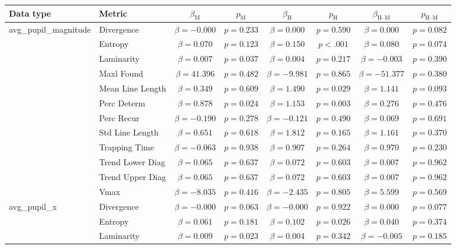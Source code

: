 \begin{tabular}{llcc|cc|cc}
\toprule
Data type & Metric & $\beta_{\text{M}}$ & $p_{\text{M}}$ & $\beta_{\text{H}}$ & $p_{\text{H}}$ & $\beta_{\text{H--M}}$ & $p_{\text{H--M}}$ \\
\midrule
\multirow{12}{*}{avg_pupil_magnitude} & Divergence & $\beta = -0.000$ & $p = 0.233$ & $\beta = 0.000$ & $p = 0.590$ & $\beta = 0.000$ & $p = 0.082$ \\
 & Entropy & $\beta = 0.070$ & $p = 0.123$ & $\beta = 0.150$ & $p < .001$ & $\beta = 0.080$ & $p = 0.074$ \\
 & Laminarity & $\beta = 0.007$ & $p = 0.037$ & $\beta = 0.004$ & $p = 0.217$ & $\beta = -0.003$ & $p = 0.390$ \\
 & Maxl Found & $\beta = 41.396$ & $p = 0.482$ & $\beta = -9.981$ & $p = 0.865$ & $\beta = -51.377$ & $p = 0.380$ \\
 & Mean Line Length & $\beta = 0.349$ & $p = 0.609$ & $\beta = 1.490$ & $p = 0.029$ & $\beta = 1.141$ & $p = 0.093$ \\
 & Perc Determ & $\beta = 0.878$ & $p = 0.024$ & $\beta = 1.153$ & $p = 0.003$ & $\beta = 0.276$ & $p = 0.476$ \\
 & Perc Recur & $\beta = -0.190$ & $p = 0.278$ & $\beta = -0.121$ & $p = 0.490$ & $\beta = 0.069$ & $p = 0.691$ \\
 & Std Line Length & $\beta = 0.651$ & $p = 0.618$ & $\beta = 1.812$ & $p = 0.165$ & $\beta = 1.161$ & $p = 0.370$ \\
 & Trapping Time & $\beta = -0.063$ & $p = 0.938$ & $\beta = 0.907$ & $p = 0.264$ & $\beta = 0.970$ & $p = 0.230$ \\
 & Trend Lower Diag & $\beta = 0.065$ & $p = 0.637$ & $\beta = 0.072$ & $p = 0.603$ & $\beta = 0.007$ & $p = 0.962$ \\
 & Trend Upper Diag & $\beta = 0.065$ & $p = 0.637$ & $\beta = 0.072$ & $p = 0.603$ & $\beta = 0.007$ & $p = 0.962$ \\
 & Vmax & $\beta = -8.035$ & $p = 0.416$ & $\beta = -2.435$ & $p = 0.805$ & $\beta = 5.599$ & $p = 0.569$ \\
\midrule
\multirow{12}{*}{avg_pupil_x} & Divergence & $\beta = -0.000$ & $p = 0.063$ & $\beta = -0.000$ & $p = 0.922$ & $\beta = 0.000$ & $p = 0.077$ \\
 & Entropy & $\beta = 0.061$ & $p = 0.181$ & $\beta = 0.102$ & $p = 0.026$ & $\beta = 0.040$ & $p = 0.374$ \\
 & Laminarity & $\beta = 0.009$ & $p = 0.023$ & $\beta = 0.004$ & $p = 0.342$ & $\beta = -0.005$ & $p = 0.185$ \\

\end{tabular}
